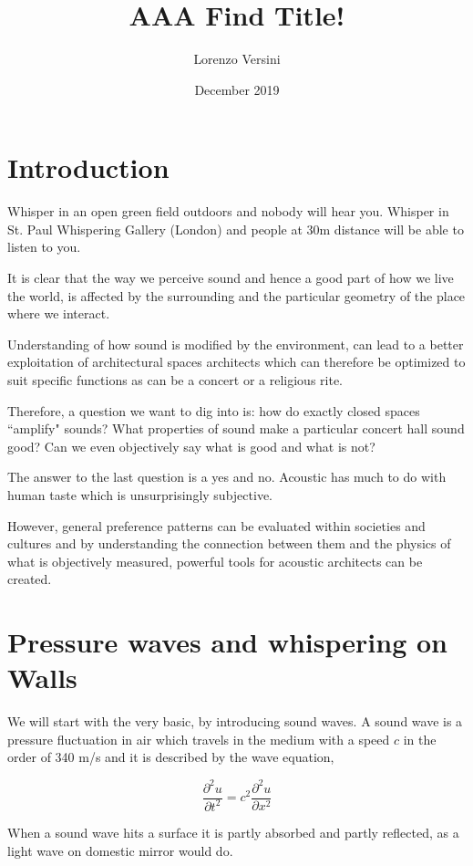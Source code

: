 \documentclass[a4paper]{article}
\title{AAA Find Title!}
\author{Lorenzo Versini}
\date{December 2019}
\begin{document}

\twocolumn
\section{Introduction}


Whisper in an open green field outdoors and nobody will hear you. Whisper in St. Paul Whispering Gallery (London) and people at 30m distance will be able to listen to you.

It is clear that the way we perceive sound and hence a good part of how we live the world, is affected by the surrounding and the particular geometry of the place where we interact.

Understanding of how sound is modified by the environment, can lead to a better exploitation of architectural spaces architects which can therefore be optimized to suit specific functions as can be a concert or a religious rite.

Therefore, a question we want to dig into is: how do exactly closed spaces ``amplify" sounds? What properties of sound make a particular concert hall sound good? Can we even objectively say what is good and what is not?

The answer to the last question is a yes and no. Acoustic has much to do with human taste which is unsurprisingly subjective. 

However, general preference patterns can be evaluated within societies and cultures and by understanding the connection between them and the physics of what is objectively measured, powerful tools for acoustic architects can be created.

\section{Pressure waves and whispering on Walls}

We will start with the very basic, by introducing sound waves. A sound wave is a pressure fluctuation in air \cite{book:university_physics} which travels in the medium with a speed $c$ in the order of 340 m/s and it is described by the wave equation,

\begin{equation}
\frac{\partial^2 u}{\partial t^2} = c^2 \frac{\partial^2 u}{\partial x^2}
\end{equation}

When a sound wave hits a surface it is partly absorbed and partly reflected, as a light wave on domestic mirror would do.
\end{document}
